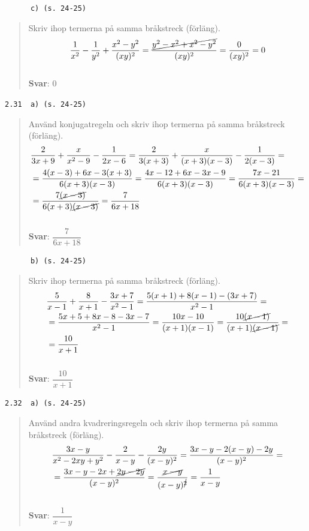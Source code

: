 \documentclass[a4paper]{article}
\newcommand{\tskcol}[1]{\textcolor{tskcol}{#1}}
\begin{document}
	\texttt{\tskcol{~~~~~~c) (s. 24-25)}}
	\begin{quotation}
		\noindent
		Skriv ihop termerna på samma bråkstreck (förläng).
		\[\frac{1}{x^2}-\frac{1}{y^2}+\frac{x^2-y^2}{(xy)^2}=
		\frac{\cancel{y^2-x^2+x^2-y^2}}{(xy)^2}=
		\frac{0}{(xy)^2}=
		0\]
		\\
		\textbf{Svar}: $0$
	\end{quotation}
	
	\texttt{\tskcol{2.31~~a) (s. 24-25)}}
	\begin{quotation}
		\noindent
		Använd konjugatregeln och skriv ihop termerna på samma bråkstreck (förläng).
		\begin{align*}
			& \frac{2}{3x+9}+\frac{x}{x^2-9}-\frac{1}{2x-6}=
			\frac{2}{3(x+3)}+\frac{x}{(x+3)(x-3)}-\frac{1}{2(x-3)}= \\
			& =\frac{4(x-3)+6x-3(x+3)}{6(x+3)(x-3)}=
			\frac{4x-12+6x-3x-9}{6(x+3)(x-3)}=
			\frac{7x-21}{6(x+3)(x-3)}= \\
			& =\frac{7\cancel{(x-3)}}{6(x+3)\cancel{(x-3)}}=
			\frac{7}{6x+18}
		\end{align*}
		\\
		\textbf{Svar}: $\dfrac{7}{6x+18}$
	\end{quotation}
	
	\texttt{\tskcol{~~~~~~b) (s. 24-25)}}
	\begin{quotation}
		\noindent
		Skriv ihop termerna på samma bråkstreck (förläng).
		\begin{align*}
			& \frac{5}{x-1}+\frac{8}{x+1}-\frac{3x+7}{x^2-1}=
			\frac{5(x+1)+8(x-1)-(3x+7)}{x^2-1}= \\
			& =\frac{5x+5+8x-8-3x-7}{x^2-1}=
			\frac{10x-10}{(x+1)(x-1)}=
			\frac{10\cancel{(x-1)}}{(x+1)\cancel{(x-1)}}= \\
			& =\frac{10}{x+1}
		\end{align*}
		\\
		\textbf{Svar}: $\dfrac{10}{x+1}$
	\end{quotation}
	
	\texttt{\tskcol{2.32~~a) (s. 24-25)}}
	\begin{quotation}
		\noindent
		Använd andra kvadreringsregeln och skriv ihop termerna på samma bråkstreck (förläng).
		\begin{align*}
			& \frac{3x-y}{x^2-2xy+y^2}-\frac{2}{x-y}-\frac{2y}{(x-y)^2}=
			\frac{3x-y-2(x-y)-2y}{(x-y)^2}= \\
			& =\frac{3x-y-2x+\cancel{2y-2y}}{(x-y)^2}=
			\frac{\cancel{x-y}}{(x-y)^{\cancel{2}}}=
			\frac{1}{x-y}
		\end{align*}
		\\
		\textbf{Svar}: $\dfrac{1}{x-y}$
	\end{quotation}
	
\end{document}
